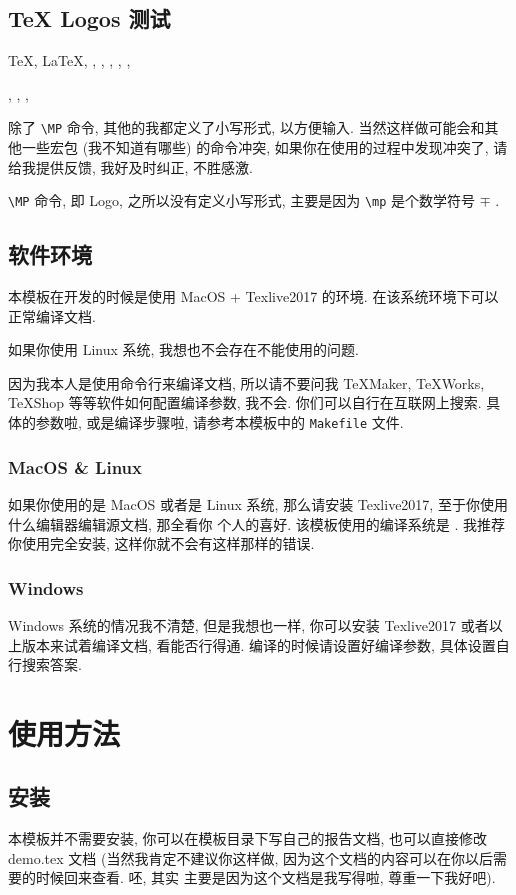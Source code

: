 \documentclass{cugrep}
\begin{document}
\section{\TeX{} Logos 测试}
\TeX{}, \LaTeX{}, \LaTeXe{}, \XeTeX{}, \XeLaTeX{}, \LuaTeX{}, \LuaLaTeX{}, 

\MF{}, \MP{}, \BIBTEX, \AMSTEX

除了 \texttt{\textbackslash MP} 命令, 其他的我都定义了小写形式, 以方便输入.
当然这样做可能会和其他一些宏包 (我不知道有哪些) 的命令冲突, 如果你在使用的过程中发现冲突了, 
请给我提供反馈, 我好及时纠正, 不胜感激. 

\texttt{\textbackslash MP} 命令, 即 \MP{} Logo, 之所以没有定义小写形式, 主要是因为 
\texttt{\textbackslash mp} 是个数学符号 $\mp$ .

\section{软件环境}
本模板在开发的时候是使用 MacOS + Texlive2017 的环境. 在该系统环境下可以正常编译文档.

如果你使用 Linux 系统, 我想也不会存在不能使用的问题. 

因为我本人是使用命令行来编译文档, 所以请不要问我 TeXMaker, TeXWorks, TeXShop 等等软件如何配置编译参数,
我不会. 你们可以自行在互联网上搜索. 具体的参数啦, 或是编译步骤啦, 请参考本模板中的 \texttt{Makefile}
文件. 
\subsection{MacOS \& Linux}
如果你使用的是 MacOS 或者是 Linux 系统, 那么请安装 Texlive2017, 至于你使用什么编辑器编辑源文档, 那全看你
个人的喜好. 该模板使用的编译系统是 \xelatex. 我推荐你使用完全安装, 这样你就不会有这样那样的错误.

\subsection{Windows}
Windows 系统的情况我不清楚, 但是我想也一样, 你可以安装 Texlive2017 或者以上版本来试着编译文档,
看能否行得通. 编译的时候请设置好编译参数, 具体设置自行搜索答案. 
\chapter{使用方法}
\section{安装}
本模板并不需要安装, 你可以在模板目录下写自己的报告文档, 也可以直接修改 demo.tex 文档 
(当然我肯定不建议你这样做, 因为这个文档的内容可以在你以后需要的时候回来查看. 呸, 其实
主要是因为这个文档是我写得啦, 尊重一下我好吧).
\end{document}
